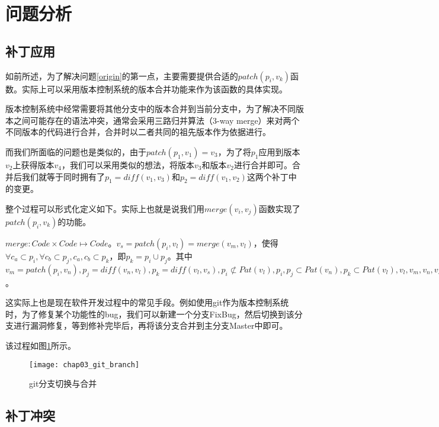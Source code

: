 \section{问题分析}
\label {problem_analysis}

\subsection{补丁应用}
\label {patch_app}

如前所述，为了解决问题\ref {origin}的第一点，主要需要提供合适的$patch(p_i,v_k)$函数。实际上可以采用版本控制系统的版本合并功能来作为该函数的具体实现。

版本控制系统中经常需要将其他分支中的版本合并到当前分支中，为了解决不同版本之间可能存在的语法冲突，通常会采用三路归并算法（3-way merge）来对两个不同版本的代码进行合并，合并时以二者共同的祖先版本作为依据进行。

而我们所面临的问题也是类似的，由于$patch(p_1,v_1) = v_3$，为了将$p_1$应用到版本$v_2$上获得版本$v_4$，我们可以采用类似的想法，将版本$v_3$和版本$v_2$进行合并即可。合并后我们就等于同时拥有了$p_1 = diff(v_1,v_3)$和$p_2 = diff(v_1,v_2)$这两个补丁中的变更。

整个过程可以形式化定义如下。实际上也就是说我们用$merge(v_i,v_j)$函数实现了$patch(p_i,v_k)$的功能。

\begin{definition}
	$merge: Code \times Code \mapsto Code$。$v_s = patch(p_i,v_l) = merge(v_m,v_l)$，使得$\forall c_a \subset p_i,\forall c_b \subset p_j,c_a,c_b \subset p_k$，即$p_k = p_i \cup p_j$。其中$v_m = patch(p_i,v_n),p_j = diff(v_n,v_l),p_k = diff(v_l,v_s),p_i \not \subset Pat(v_l),p_i,p_j \subset Pat(v_n),p_k \subset Pat(v_l),v_l,v_m,v_n,v_s \subset Code,a,b,i,j,k,l,m,n,s \subset \mathbb{N}$。
\end{definition}

这实际上也是现在软件开发过程中的常见手段。例如使用git作为版本控制系统时，为了修复某个功能性的bug，我们可以新建一个分支FixBug，然后切换到该分支进行漏洞修复，等到修补完毕后，再将该分支合并到主分支Master中即可。

该过程如图\ref{git_branch}所示。

\begin{figure}[H]	
	\centering
	\texttt{[image: chap03\_git\_branch]}
	\caption {git分支切换与合并}	
	\label {git_branch}
\end{figure}


\subsection{补丁冲突}
\label {conflict}

